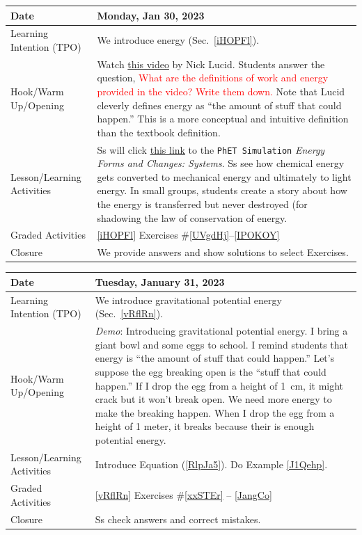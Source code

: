 \documentclass{article}
\numberwithin{equation}{section}
\numberwithin{figure}{section}
\begin{document}
\begin{tabular}{|m{}|m{}|}
    \hline  
    \cellcolor{black!20}\textbf{Date} &
    \cellcolor{black!20}\textbf{Monday, Jan 30, 2023} \\
    \hline
    Learning Intention (TPO) & We introduce \gls{energy} (Sec.~\ref{iHOPFl}). \\
    \hline
    Hook/Warm Up/Opening & Watch \href{https://youtu.be/snj1wBtn6I8}{this video} by Nick Lucid. Students answer the question, \textcolor{red}{What are the definitions of work and energy provided in the video? Write them down.} Note that Lucid cleverly defines energy as ``the amount of stuff that could happen.'' This is a more conceptual and intuitive definition than the textbook definition.\\
    \hline
    Lesson/Learning Activities & Ss will click \href{https://phet.colorado.edu/sims/html/energy-forms-and-changes/latest/energy-forms-and-changes_en.html}{this link} to the \texttt{PhET Simulation} \textit{Energy Forms and Changes: Systems}. Ss see how chemical energy gets converted to mechanical energy and ultimately to light energy. In small groups, students create a story about how the energy is transferred but never destroyed (for shadowing the \gls{law of conservation of energy}.\\
    \hline
    Graded Activities & \ref{iHOPFl} Exercises \#\ref{UVgdHj}--\ref{IPOKOY} \\
    \hline
    Closure & We provide answers and show solutions to select Exercises.\\
    \hline
\end{tabular}

\begin{tabular}{|m{}|m{}|}
    \hline  
    \cellcolor{black!20}\textbf{Date} &
    \cellcolor{black!20}\textbf{Tuesday, January 31, 2023} \\
    \hline
    Learning Intention (TPO) & We introduce \gls{gravitational potential energy} (Sec.~\ref{vRflRn}). \\
    \hline
    Hook/Warm Up/Opening & \textit{Demo}: Introducing gravitational potential energy. I bring a giant bowl and some eggs to school. I remind students that energy is ``the amount of stuff that could happen.'' Let's suppose the egg breaking open is the ``stuff that could happen.'' If I drop the egg from a height of \SI{1}{cm}, it might crack but it won't break open. We need more energy to make the breaking happen. When I drop the egg from a height of 1 meter, it breaks because their is enough potential energy.\\
    \hline
    Lesson/Learning Activities & Introduce Equation (\ref{RlpJa5}). Do Example \ref{J1Qehp}.\\
    \hline
    Graded Activities & \ref{vRflRn} Exercises \#\ref{xxSTEr} -- \ref{JangCo} \\
    \hline
    Closure & Ss check answers and correct mistakes.\\  
    \hline
\end{tabular}    
\end{document}
